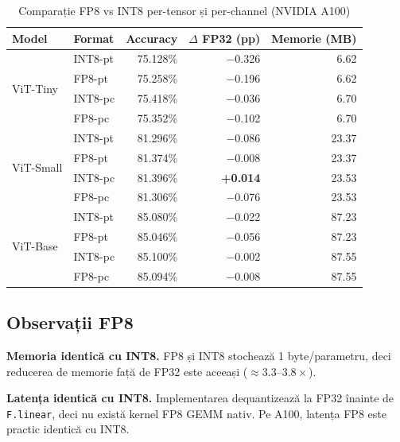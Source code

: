 \documentclass[12pt,a4paper]{article}
\newcommand{\dpos}[1]{\textcolor{posgreen}{\textbf{#1}}}
\newcommand{\dneg}[1]{\textcolor{negred}{#1}}
\begin{document}
\begin{table}[H]
  \centering
  \caption{Comparație FP8 vs INT8 per-tensor și per-channel (NVIDIA A100)}
  \small
  \begin{tabular}{llrrr}
    \toprule
    \textbf{Model} & \textbf{Format} & \textbf{Accuracy} &
    \textbf{$\Delta$ FP32 (pp)} & \textbf{Memorie (MB)} \\
    \midrule
    \multirow{4}{*}{ViT-Tiny}
      & \textcolor{int8ptcolor}{INT8-pt} & 75.128\% & \dneg{$-$0.326} & 6.62 \\
      & \textcolor{fp8ptcolor}{FP8-pt}   & 75.258\% & \dneg{$-$0.196} & 6.62 \\
      & \textcolor{int8pccolor}{INT8-pc} & 75.418\% & \dneg{$-$0.036} & 6.70 \\
      & \textcolor{fp8pccolor}{FP8-pc}   & 75.352\% & \dneg{$-$0.102} & 6.70 \\
    \midrule
    \multirow{4}{*}{ViT-Small}
      & \textcolor{int8ptcolor}{INT8-pt} & 81.296\% & \dneg{$-$0.086} & 23.37 \\
      & \textcolor{fp8ptcolor}{FP8-pt}   & 81.374\% & \dneg{$-$0.008} & 23.37 \\
      & \textcolor{int8pccolor}{INT8-pc} & 81.396\% & \dpos{+0.014}   & 23.53 \\
      & \textcolor{fp8pccolor}{FP8-pc}   & 81.306\% & \dneg{$-$0.076} & 23.53 \\
    \midrule
    \multirow{4}{*}{ViT-Base}
      & \textcolor{int8ptcolor}{INT8-pt} & 85.080\% & \dneg{$-$0.022} & 87.23 \\
      & \textcolor{fp8ptcolor}{FP8-pt}   & 85.046\% & \dneg{$-$0.056} & 87.23 \\
      & \textcolor{int8pccolor}{INT8-pc} & 85.100\% & \dneg{$-$0.002} & 87.55 \\
      & \textcolor{fp8pccolor}{FP8-pc}   & 85.094\% & \dneg{$-$0.008} & 87.55 \\
    \bottomrule
  \end{tabular}
  \label{tab:fp8cross}
\end{table}

\subsection{Observații FP8}

\textbf{Memoria identică cu INT8.} FP8 și INT8 stochează 1 byte/parametru,
deci reducerea de memorie față de FP32 este aceeași ($\approx 3.3$--$3.8\times$).

\textbf{Latența identică cu INT8.} Implementarea dequantizează la FP32
înainte de \texttt{F.linear}, deci nu există kernel FP8 GEMM nativ.
Pe A100, latența FP8 este practic identică cu INT8.
\end{document}
